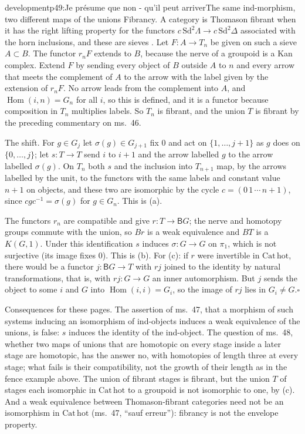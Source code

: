 \begin{dcomment}{development}{p49:Je présume que non - qu'il peut arriver}{The same ind-morphism, two different maps of the unions}
Fibrancy. A category is Thomason fibrant when it has the right lifting property for the functors $c\,\mathrm{Sd}^2\Lambda\to c\,\mathrm{Sd}^2\Delta$ associated with the horn inclusions, and these are sieves \citep[Proposition~4.2]{Thomason1980}. Let $F:A\to T_n$ be given on such a sieve $A\subset B$. The functor $r_nF$ extends to $B$, because the nerve of a groupoid is a Kan complex. Extend $F$ by sending every object of $B$ outside $A$ to $n$ and every arrow that meets the complement of $A$ to the arrow with the label given by the extension of $r_nF$. No arrow leads from the complement into $A$, and $\operatorname{Hom}(i,n)=G_n$ for all $i$, so this is defined, and it is a functor because composition in $T_n$ multiplies labels. So $T_n$ is fibrant, and the union $T$ is fibrant by the preceding commentary on ms.~46.

The shift. For $g\in G_j$ let $\sigma(g)\in G_{j+1}$ fix $0$ and act on $\{1,\dots,j+1\}$ as $g$ does on $\{0,\dots,j\}$; let $s:T\to T$ send $i$ to $i+1$ and the arrow labelled $g$ to the arrow labelled $\sigma(g)$. On $T_n$ both $s$ and the inclusion into $T_{n+1}$ map, by the arrows labelled by the unit, to the functors with the same labels and constant value $n+1$ on objects, and these two are isomorphic by the cycle $c=(0\,1\,\cdots\,n+1)$, since $cgc^{-1}=\sigma(g)$ for $g\in G_n$. This is (a).

The functors $r_n$ are compatible and give $r:T\to\mathsf BG$; the nerve and homotopy groups commute with the union, so $Br$ is a weak equivalence and $BT$ is a $K(G,1)$. Under this identification $s$ induces $\sigma:G\to G$ on $\pi_1$, which is not surjective (its image fixes $0$). This is (b). For (c): if $r$ were invertible in $\mathrm{Cat}\,\mathrm{hot}$, there would be a functor $j:\mathsf BG\to T$ with $rj$ joined to the identity by natural transformations, that is, with $rj:G\to G$ an inner automorphism. But $j$ sends the object to some $i$ and $G$ into $\operatorname{Hom}(i,i)=G_i$, so the image of $rj$ lies in $G_i\neq G$.\hfill$\square$

Consequences for these pages. The assertion of ms.~47, that a morphism of such systems inducing an isomorphism of ind-objects induces a weak equivalence of the unions, is false: $s$ induces the identity of the ind-object. The question of ms.~48, whether two maps of unions that are homotopic on every stage inside a later stage are homotopic, has the answer no, with homotopies of length three at every stage; what fails is their compatibility, not the growth of their length as in the fence example above. The union of fibrant stages is fibrant, but the union $T$ of stages each isomorphic in $\mathrm{Cat}\,\mathrm{hot}$ to a groupoid is not isomorphic to one, by (c). And a weak equivalence between Thomason-fibrant categories need not be an isomorphism in $\mathrm{Cat}\,\mathrm{hot}$ (ms.~47, ``sauf erreur''): fibrancy is not the envelope property.
\end{dcomment}


